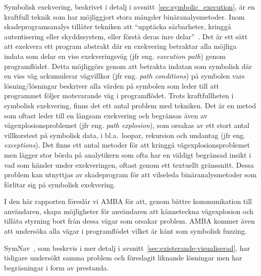 Symbolisk exekvering, beskrivet i detalj i avsnitt~\ref{sec:symbolic_execution},
är en kraftfull teknik som har möjliggjort stora mängder
binäranalysmetoder\cite{survey_symb_exc, symnav}. Inom skadeprogramsanalys
tillåter tekniken att ``upptäcka sårbarheter, kringgå autentisering eller
skyddssystem, eller förstå deras inre delar''~\cite{symnav}. Det är ett sätt
att exekvera ett program abstrakt där en exekvering betraktar alla möjliga
indata som delar en viss exekveringsväg (jfr eng. \emph{execution path}) genom
programflödet. Detta möjliggörs genom att betrakta indatan som symbolisk där en
viss väg ackumulerar vägvillkor (jfr eng. \emph{path conditions}) på symbolen
vars lösning/lösningar beskriver alla värden på symbolen som leder till att
programmet följer motsvarande väg i programflödet. Trots kraftfullheten i
symbolisk exekvering, finns det ett antal problem med tekniken. Det är en metod
som oftast leder till en långsam exekvering och begränsas även av
vägexplosionsproblemet (jfr eng. \emph{path explosion}), som orsakas av ett
stort antal villkorstest på symbolisk data, i bl.a.\ loopar, rekursion och
undantag (jfr eng. \emph{exceptions}). Det finns ett antal metoder för att
kringgå vägexplosionsproblemet men lägger stor börda på analytikern som ofta
har en väldigt begränsad insikt i vad som händer under exekveringen, oftast
genom ett textuellt gränssnitt. Dessa problem kan utnyttjas av skadeprogram för
att vilseleda binäranalysmetoder som förlitar sig på symbolisk exekvering.

I den här rapporten föreslår vi AMBA för att, genom bättre kommunikation till
användaren, skapa möjligheter för användaren att känneteckna vägexplosion och
tillåta styrning bort från dessa vägar som orsakar problem. AMBA kommer även
att undersöka alla vägar i programflödet vilket är känt som symbolisk fuzzing.

SymNav~\cite{symnav}, som beskrvis i mer detalj i
avsnitt~\ref{sec:existerande-visualiserad}, har tidigare undersökt samma problem och
föreslagit liknande lösningar men har begräsningar i form av prestanda.



%
